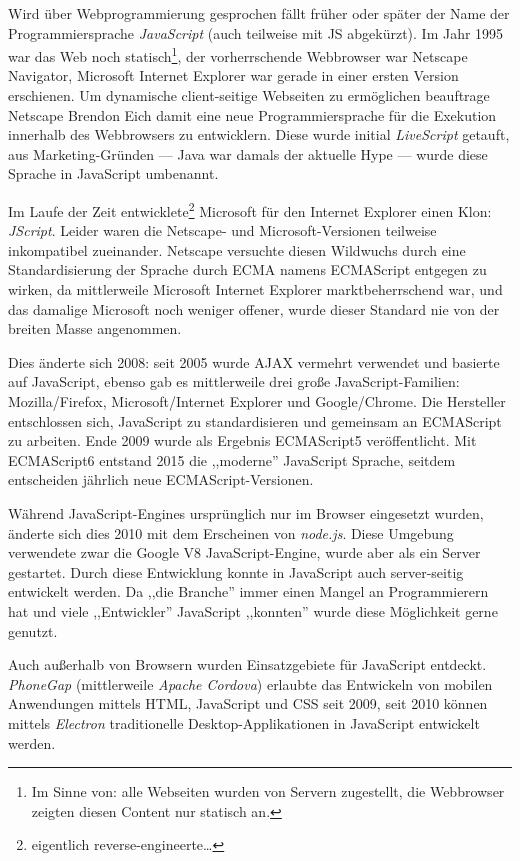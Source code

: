 Wird über Webprogrammierung gesprochen fällt früher oder später der Name der Programmiersprache \textit{JavaScript} (auch teilweise mit JS abgekürzt). Im Jahr 1995 war das Web noch statisch\footnote{Im Sinne von: alle Webseiten wurden von Servern zugestellt, die Webbrowser zeigten diesen Content nur statisch an.}, der vorherrschende Webbrowser war Netscape Navigator, Microsoft Internet Explorer war gerade in einer ersten Version erschienen. Um dynamische client-seitige Webseiten zu ermöglichen beauftrage Netscape Brendon Eich damit eine neue Programmiersprache für die Exekution innerhalb des Webbrowsers zu entwicklern. Diese wurde initial \textit{LiveScript} getauft, aus Marketing-Gründen --- Java war damals der aktuelle Hype --- wurde diese Sprache in JavaScript umbenannt.

Im Laufe der Zeit entwicklete\footnote{eigentlich reverse-engineerte\ldots} Microsoft für den Internet Explorer einen Klon: \textit{JScript}. Leider waren die Netscape- und Microsoft-Versionen teilweise inkompatibel zueinander. Netscape versuchte diesen Wildwuchs durch eine Standardisierung der Sprache durch ECMA namens ECMAScript entgegen zu wirken, da mittlerweile Microsoft Internet Explorer marktbeherrschend war, und das damalige Microsoft noch weniger offener, wurde dieser Standard nie von der breiten Masse angenommen.

Dies änderte sich 2008: seit 2005 wurde AJAX vermehrt verwendet und basierte auf JavaScript, ebenso gab es mittlerweile drei große JavaScript-Familien: Mozilla/Firefox, Microsoft/Internet Explorer und Google/Chrome. Die Hersteller entschlossen sich, JavaScript zu standardisieren und gemeinsam an ECMAScript zu arbeiten. Ende 2009 wurde als Ergebnis ECMAScript5 veröffentlicht. Mit ECMAScript6 entstand 2015 die ,,moderne'' JavaScript Sprache, seitdem entscheiden jährlich neue ECMAScript-Versionen.

Während JavaScript-Engines ursprünglich nur im Browser eingesetzt wurden, änderte sich dies 2010 mit dem Erscheinen von \textit{node.js}. Diese Umgebung verwendete zwar die Google V8 JavaScript-Engine, wurde aber als ein Server gestartet. Durch diese Entwicklung konnte in JavaScript auch server-seitig entwickelt werden. Da ,,die Branche'' immer einen Mangel an Programmierern hat und viele ,,Entwickler'' JavaScript ,,konnten'' wurde diese Möglichkeit gerne genutzt.

Auch außerhalb von Browsern wurden Einsatzgebiete für JavaScript entdeckt. \textit{PhoneGap} (mittlerweile \textit{Apache Cordova}) erlaubte das Entwickeln von mobilen Anwendungen mittels HTML, JavaScript und CSS seit 2009, seit 2010 können mittels \textit{Electron} traditionelle Desktop-Applikationen in JavaScript entwickelt werden.

